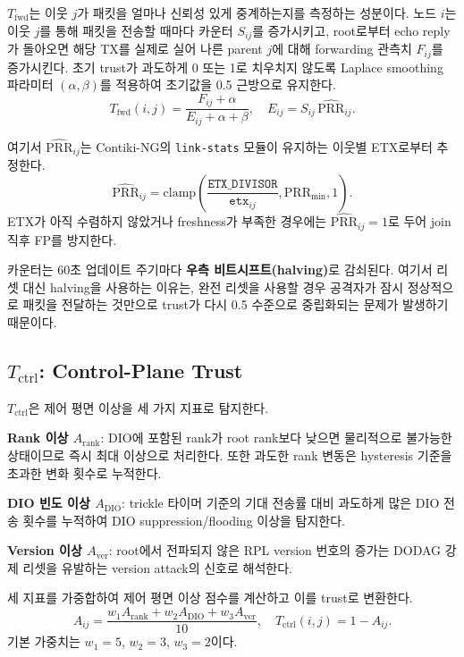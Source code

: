 \documentclass[12pt,a4paper]{article}
\begin{document}
$T_\text{fwd}$는 이웃 $j$가 패킷을 얼마나 신뢰성 있게 중계하는지를
측정하는 성분이다. 노드 $i$는 이웃 $j$를 통해 패킷을 전송할 때마다
카운터 $S_{ij}$를 증가시키고, root로부터 echo reply가 돌아오면
해당 TX를 실제로 실어 나른 parent $j$에 대해 forwarding 관측치 $F_{ij}$를 증가시킨다.
초기 trust가 과도하게 0 또는 1로 치우치지 않도록 Laplace smoothing
파라미터 $(\alpha,\beta)$를 적용하여 초기값을 0.5 근방으로 유지한다.
\begin{equation}
  T_\text{fwd}(i,j) = \frac{F_{ij} + \alpha}{E_{ij} + \alpha + \beta}, \quad
  E_{ij} = S_{ij}\,\widehat{\mathrm{PRR}}_{ij}.
  \label{eq:tfwd}
\end{equation}

여기서 $\widehat{\mathrm{PRR}}_{ij}$는 Contiki-NG의 \texttt{link-stats} 모듈이 유지하는
이웃별 ETX로부터 추정한다.
\begin{equation}
  \widehat{\mathrm{PRR}}_{ij}
  = \mathrm{clamp}\!\left(
      \frac{\texttt{ETX\_DIVISOR}}{\texttt{etx}_{ij}},
      \mathrm{PRR}_{\min},
      1
    \right).
\end{equation}
ETX가 아직 수렴하지 않았거나 freshness가 부족한 경우에는
$\widehat{\mathrm{PRR}}_{ij}=1$로 두어 join 직후 FP를 방지한다.

카운터는 60초 업데이트 주기마다 \textbf{우측 비트시프트(halving)}로 감쇠된다.
여기서 리셋 대신 halving을 사용하는 이유는, 완전 리셋을 사용할 경우
공격자가 잠시 정상적으로 패킷을 전달하는 것만으로 trust가 다시 0.5 수준으로
중립화되는 문제가 발생하기 때문이다.

\subsection{$T_\text{ctrl}$: Control-Plane Trust}

$T_\text{ctrl}$은 제어 평면 이상을 세 가지 지표로 탐지한다.

\textbf{Rank 이상 $A_\text{rank}$}: DIO에 포함된 rank가 root rank보다 낮으면
물리적으로 불가능한 상태이므로 즉시 최대 이상으로 처리한다.
또한 과도한 rank 변동은 hysteresis 기준을 초과한 변화 횟수로 누적한다.

\textbf{DIO 빈도 이상 $A_\text{DIO}$}: trickle 타이머 기준의 기대 전송률 대비
과도하게 많은 DIO 전송 횟수를 누적하여 DIO suppression/flooding 이상을 탐지한다.

\textbf{Version 이상 $A_\text{ver}$}: root에서 전파되지 않은 RPL version 번호의 증가는
DODAG 강제 리셋을 유발하는 version attack의 신호로 해석한다.

세 지표를 가중합하여 제어 평면 이상 점수를 계산하고 이를 trust로 변환한다.
\begin{equation}
  A_{ij} = \frac{w_1 A_\text{rank} + w_2 A_\text{DIO} + w_3 A_\text{ver}}{10},\quad
  T_\text{ctrl}(i,j) = 1 - A_{ij}.
\end{equation}
기본 가중치는 $w_1=5$, $w_2=3$, $w_3=2$이다.
\end{document}
